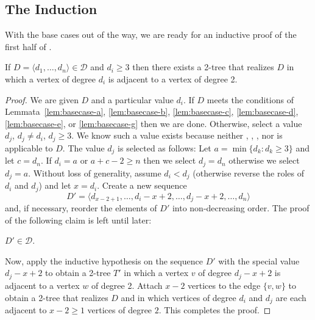 \documentclass[lotsofwhite,charterfonts]{patmorin}
\begin{document}
\subsection{The Induction}

With the base cases out of the way, we are ready for an inductive
proof of the first half of .

\begin{lem}
If $D=\langle d_1,\ldots,d_n\rangle \in \mathcal{D}$ and $d_i\ge 3$
then there exists a 2-tree that realizes $D$ in which a vertex of
degree $d_i$ is adjacent to a vertex of degree 2.  
\end{lem}

\begin{proof}
We are given $D$ and a particular value $d_i$. If $D$ meets the
conditions of Lemmata~\ref{lem:basecase-a}, \ref{lem:basecase-b},
\ref{lem:basecase-c}, \ref{lem:basecase-d}, \ref{lem:basecase-e}, or
\ref{lem:basecase-g} then we are done.  Otherwise, select a value
$d_j$, $d_j\neq d_i$, $d_j\ge 3$.  We know such a value exists because
neither , , ,
nor  is applicable to $D$.  The value $d_j$ is
selected as follows:  Let $a=\min\{d_k : d_k\ge 3\}$ and let $c=d_n$.
If $d_i=a$ or $a+c-2 \ge n$ then we select $d_j=d_n$ otherwise we
select $d_j=a$.  Without loss of generality, assume $d_i < d_j$
(otherwise reverse the roles of $d_i$ and $d_j$) and let $x=d_i$.
Create a new sequence 
\[  
   D'=\langle d_{x-2+1},\ldots,d_{i}-x+2,\ldots,d_{j}-x+2,\ldots,d_n \rangle
\] 
and, if necessary, reorder the elements of $D'$ into non-decreasing
order.  The proof of the following claim is left until later:

\begin{clm}
$D'\in \mathcal{D}$.
\end{clm}

Now, apply the inductive hypothesis on the sequence $D'$ with the
special value $d_j-x+2$ to obtain a 2-tree $T'$ in which a vertex $v$
of degree $d_j-x+2$ is adjacent to a vertex $w$ of degree 2.  Attach
$x-2$ vertices to the edge $\{v,w\}$ to obtain a 2-tree that realizes
$D$ and in which vertices of degree $d_i$ and $d_j$ are each adjacent
to $x-2\ge 1$ vertices of degree $2$.  This completes the proof.
\end{proof}
\end{document}
